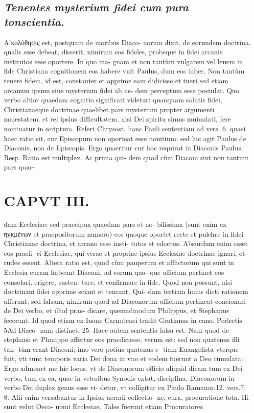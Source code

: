 \documentclass{article}
\begin{document}
\begin{pages}
\subsection*{\textit{ Tenentes mysterium fidei cum pura tonscientia. }}\pstart Α'κολόθησις est, postquam de moribus Diaco- norum dixit, de eorundem doctrina, qualis esse debeat, disserit, nimirum eos fideles, probeque in fidei arcanis institutos esse oportere. In quo ma- gnam et non tantùm vulgarem vel leuem in fide Christiana cognitionem eos habere vult Paulus, dum eos iuber, Non tantùm tenere fidem, id est, constanter et apprime eam didicisse et tueri sed etiam arcanum ipsum siue mysterium fidei ab iis- dem perceptum esse postulat. Quo verbo altior quaedam cognitio significari videtur: quanquam salutis fidei, Christianaeque doctrinae quaelibet pars mysterium propter argumenti maiestatem. et rei ipsius difficultatem, nisi Dei spiritu simus muimdati, fere nominatur in scriptura. Refert Chrysost. hanc Pauli sententiam ad vers. 6. quasi haec ratio sit, cur Episcopum non oporteat esse nouitium: sed hic agit Paulus de Diaconis, non de Episcopis.  \pend\pstart Ergo quaeritur cur hoc requirat in Diaconis Paulus. Resp. Ratio est multiplex. Ac prima qui- dem quod cùm Diaconi sint non tantum pars quae-  \pend
\section*{CAPVT   III. }
\marginpar{[ p.161 ]}\pstart dam Ecclesiae: sed praecipua quaedam pars et no- bilissima (sunt enim ex ηγκμένων et praepositorum numero) eos quoque oportet recte et pulchre in fidei Christianae doctrina, et arcano esse insti- tutos et edoctos. Absurdum enim esset eos praefi- ci Ecclesiae, qui verae et propriae ipsius Ecclesiae doctrinae ignari, et rudes essent. Altera ratio est, quod cùm pauperum et afflictorum qui sunt in Ecclesia curam habeant Diaconi, ad eorum quo- que officium pertinet eos consolari, erigere, susten- tare, et confirmare in fide. Quod non possunt, nisi doctrinam fidei apprime sciant et teneant. Qui- dam tertiam huius dicti rationem afferunt, sed falsam, nimirum quod ad Diaconorum officium pertineat concionari de Dei verbo, et illud prae- dicare, quemadmodum Philippus, et Stephanus fecerunt. Id quod etiam ex Iuone Carnutensi tradit Gratianus in cano. Perlectis 5Ad Diaco- num distinct. 25. Haec autem sententia falsa est. Nam quod de stephano et Phmippo affertur eos praedicasse, verum est: sed non quatenus illi tan- tùm erant Diaconi, imo vero potius quatenus e- tiam Euangelista vterque fuit, vti tunc temporis varia Dei dona in vno et eodem fuerunt a Deo cumulata:  \pend\pstart Ergo admonet me hic locus, vt de Diaconorum officio aliquid dicam tum ex Dei verbo, tum ex ea, quae in veteribus Synodis extat, disciplina. Diaconorum in verbo Dei duplex genus esse vi- detur, vt colligitur ex Paulo Ramanor.12. vers.7. 8. Alii enim versabantur in Ipsius aerarii collectio- ne, cura, procuratione tota. Hi sunt velut Oeco- uomi Ecclesiae. Tales fuerunt etiam Procuratores  \pend

\end{pages}
\end{document}
